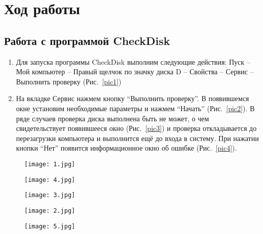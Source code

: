 \section{Ход работы}

\subsection{Работа с программой CheckDisk}
\begin{enumerate}
\item
Для запуска программы CheckDisk выполним следующие действия: Пуск -- Мой компьютер -- Правый щелчок по значку диска D -- Свойства -- Сервис -- Выполнить проверку (Рис.~\ref{pic1})
\item
На вкладке Сервис нажмем кнопку ``Выполнить проверку''. В появившемся окне установим необходимые параметры и нажмем ``Начать'' (Рис.~\ref{pic2}). В ряде случаев проверка диска выполнена быть не может, о чем свидетельствует появившееся окно (Рис.~\ref{pic3}) и проверка откладывается до перезагрузки компьютера и выполнится ещё до входа в систему. При нажатии кнопки ``Нет'' появится информационное окно об ошибке (Рис.~\ref{pic4}).
\end{enumerate}

\begin{figure}[h!t] 
  \begin{center}

  \begin{minipage}[h]{0.4\linewidth}
  \texttt{[image: 1.jpg]}
  \caption{\label{pic1}}

  \bigskip
    
  \begin{center}
  \texttt{[image: 4.jpg]}
  \caption{\label{pic4}}
  \end{center}
  \end{minipage}
  \hfill   
  \begin{minipage}[h]{0.4\linewidth}
  \texttt{[image: 3.jpg]}
  \caption{\label{pic3}}
  
  \bigskip
  
  \texttt{[image: 2.jpg]}
  \caption{\label{pic2}}
  
  \bigskip
    
  \texttt{[image: 5.jpg]}
  \caption{\label{pic5}}
  \end{minipage}    
    
  \end{center}
\end{figure}

